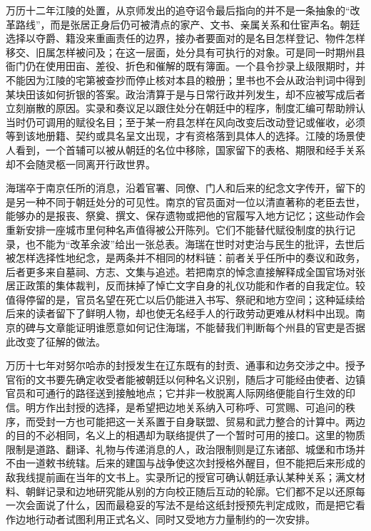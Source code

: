 万历十二年江陵的处置，从京师发出的追夺诏令最后指向的并不是一条抽象的“改革路线”，而是张居正身后仍可被清点的家产、文书、亲属关系和仕宦声名。朝廷选择以夺爵、籍没来重画责任的边界，接办者要面对的是名目怎样登记、物件怎样移交、旧属怎样被问及；在这一层面，处分具有可执行的对象。可是同一时期州县衙门仍在使用田亩、差役、折色和催解的既有簿面。一个县令抄录上级限期时，并不能因为江陵的宅第被查抄而停止核对本县的粮册；里书也不会从政治判词中得到某块田该如何折银的答案。政治清算于是与日常行政并列发生，却不应被写成后者立刻崩散的原因。实录和奏议足以跟住处分在朝廷中的程序，制度汇编可帮助辨认当时仍可调用的赋役名目；至于某一府县怎样在风向改变后改动登记或催收，必须等到该地册籍、契约或具名呈文出现，才有资格落到具体人的选择。江陵的场景使人看到，一个首辅可以被从朝廷的名位中移除，国家留下的表格、期限和经手关系却不会随灵柩一同离开行政世界。

海瑞卒于南京任所的消息，沿着官署、同僚、门人和后来的纪念文字传开，留下的是另一种不同于朝廷处分的可见性。南京的官员面对一位以清直著称的老臣去世，能够办的是报丧、祭奠、撰文、保存遗物或把他的官履写入地方记忆；这些动作会重新安排一座城市里何种名声值得被公开陈列。它们不能替代赋役制度的执行记录，也不能为“改革余波”给出一张总表。海瑞在世时对吏治与民生的批评，去世后被怎样选择性地纪念，是两条并不相同的材料链：前者关乎任所中的奏议和政务，后者更多来自墓祠、方志、文集与追述。若把南京的悼念直接解释成全国官场对张居正政策的集体裁判，反而抹掉了悼亡文字自身的礼仪功能和作者的自我定位。较值得停留的是，官员名望在死亡以后仍能进入书写、祭祀和地方空间；这种延续给后来的读者留下了鲜明人物，却也使无名经手人的行政劳动更难从材料中出现。南京的碑与文章能证明谁愿意如何记住海瑞，不能替我们判断每个州县的官吏是否据此改变了征解的做法。

万历十七年对努尔哈赤的封授发生在辽东既有的封贡、通事和边务交涉之中。授予官衔的文书要先确定收受者能被朝廷以何种名义识别，随后才可能经由使者、边镇官员和可通行的路径送到接触地点；它并非一枚脱离人际网络便能自行生效的印信。明方作出封授的选择，是希望把边地关系纳入可称呼、可赏赐、可追问的秩序，而受封一方也可能把这一关系置于自身联盟、贸易和武力整合的计算中。两边的目的不必相同，名义上的相遇却为联络提供了一个暂时可用的接口。这里的物质限制是道路、翻译、礼物与传递消息的人，政治限制则是辽东诸部、城堡和市场并不由一道敕书统辖。后来的建国与战争使这次封授格外醒目，但不能把后来形成的敌我线提前画在当年的文书上。实录所记的授官可确认朝廷承认某种关系；满文材料、朝鲜记录和边地研究能从别的方向校正随后互动的轮廓。它们都不足以还原每一次会面说了什么，因而最稳妥的写法不是给这纸封授预先判定成败，而是把它看作边地行动者试图利用正式名义、同时又受地方力量制约的一次安排。

